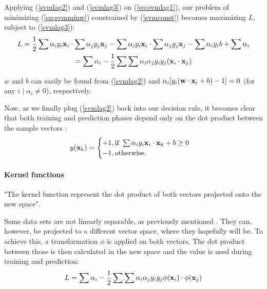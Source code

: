 Applying (\ref{svmlag2}) and (\ref{svmlag3}) on (\ref{eq:svmlag1}), our problem of minimizing (\ref{eq:svmminw}) constrained by (\ref{svmconst}) becomes maximizing $L$, subject to (\ref{svmlag3}):
\begin{gather*}
L = \frac{1}{2}\sum\alpha_i y_i \mathbf{x}_i \cdot \sum\alpha_j y_j \mathbf{x}_j
- \sum \alpha_i y_i \mathbf{x}_i \cdot \sum \alpha_j y_j \mathbf{x}_j
- \sum \alpha_i y_i b + \sum \alpha_i \\
= \sum\alpha_i -\frac{1}{2}\sum\sum\alpha_i\alpha_j y_i y_j (\mathbf{x}_i \cdot \mathbf{x}_j)
\end{gather*}

$w$ and $b$ can easily be found from (\ref{svmlag2}) and $\alpha_i[y_i(\mathbf{w} \cdot \mathbf{x}_i + b) - 1] = 0$ (for any $i \mid \alpha_i \ne 0$), respectively.

Now, as we finally plug (\ref{svmlag2}) back into our decision rule, it becomes clear that both training and prediction phases depend only on the dot product between the sample vectors \cite{mitsvm}:
\begin{align*}
	y(\mathbf{x}_k) = \begin{cases}
		+1, \text{if } \sum\alpha_i y_i \mathbf{x}_i \cdot \mathbf{x}_k +b \geq 0\\
		-1, \text{otherwise.}
	\end{cases}
\end{align*}

\paragraph{Kernel functions}

"The kernel function represent the dot product of both vectors projected onto the new space". \cite{mitsvm}

Some data sets are not linearly separable, as previously mentioned	. They can, however, be projected to a different vector space, where they hopefully will be. To achieve this, a transformation $\phi$ is applied on both vectors. The dot product between those is then calculated in the new space and the value is used during training and prediction:
\begin{gather*}
L = \sum\alpha_i -\frac{1}{2}\sum\sum\alpha_i\alpha_j y_i y_j \phi(\mathbf{x}_i) \cdot \phi(\mathbf{x}_j)
\end{gather*}

